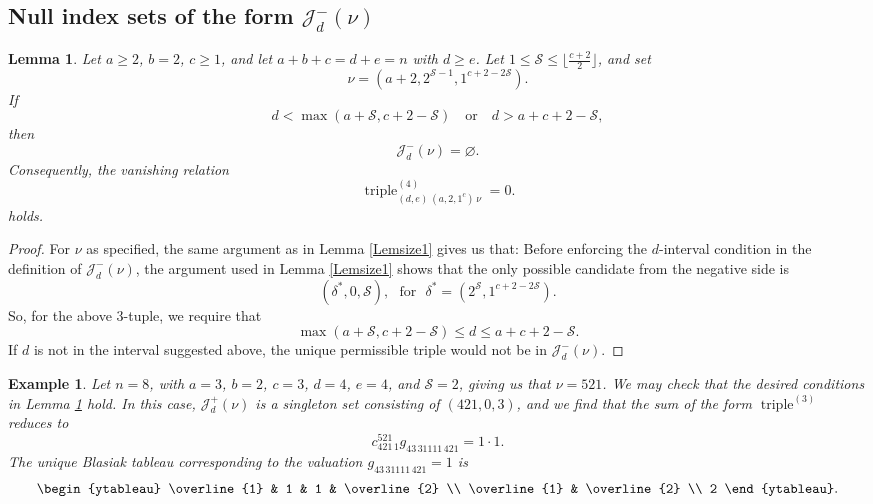 \documentclass[12pt]{article}
\newtheorem{lemma}{Lemma}%
\newtheorem{example}{Example}
\begin{document}
\subsection{Null index sets of the form $\mathcal{J}_{d}^{-}(\nu)$}

\begin{lemma}\label{nulllemma}
 Let $a \geq 2$, $b=2$, $c\geq 1$, and let $a+b+c=d+e=n$ with $d\geq e$. Let $1\leq \mathcal S\leq \lfloor \frac{c+2}{2} \rfloor$, and 
 set $$ \nu = (a+2,2^{\mathcal S-1},1^{c+2-2\mathcal S}). $$ If $$ d < \max(a+\mathcal S,c+2-\mathcal S)
 \quad\text{or}\quad
d>a+c+2-\mathcal S, $$ then $$ \mathcal J_d^{-}(\nu)=\varnothing. $$
Consequently,  the  vanishing relation 
$$ \operatorname{triple}^{(4)}_{(d,e)\,(a,2,1^c)\,\nu}=0. $$  holds. 
\end{lemma}

\begin{proof}
 For $\nu$ as specified, the same argument as in Lemma \ref{Lemsize1} gives us that: 
 Before enforcing 
 the $d$-interval condition in the definition of $\mathcal J_d^{-}(\nu)$, the argument used in Lemma \ref{Lemsize1} shows 
 that the only possible candidate from the negative side is
$$ (\delta^\ast,0,\mathcal S),
       \  \   \  \text{for}  \   \  \  \delta^\ast=(2^{\mathcal S},1^{c+2-2\mathcal S}). $$
 So, for the above 3-tuple, 
 we require that
 $$ \max(a + \mathcal{S}, c + 2 - \mathcal{S}) \leq d \leq a + c + 2 - \mathcal{S}. $$
 If $d$ is not in the interval suggested above, 
 the unique permissible triple would not be in $\mathcal{J}_{d}^{-}(\nu)$. 
\end{proof}

\begin{example}
 Let $n = 8$, with $a = 3$, $b = 2$, $c = 3$, $d = 4$, $e = 4$, and $\mathcal{S} = 2$, giving us that $\nu = 521$. We may check that the 
 desired conditions in Lemma \ref{nulllemma} hold. In this case,   $\mathcal{J}_{d}^{+}(\nu)$ is a singleton set 
 consisting of $(421, 0, 3)$, and we find that the 
 sum of the form $ \operatorname{triple}^{(3)} $ reduces to 
 $$ c_{421 \, 1}^{521} g_{43 \, 31111 \, 421} = 1 \cdot 1. $$
 The unique Blasiak tableau corresponding to the valuation 
 $ g_{43 \, 31111 \, 421} = 1 $ is 
 $$ \begin{ytableau} \overline{1} & 1 & 1 & \overline{2} \\ \overline{1} & \overline{2} \\ 2 \end{ytableau}. $$
 \end{example}
\end{document}
